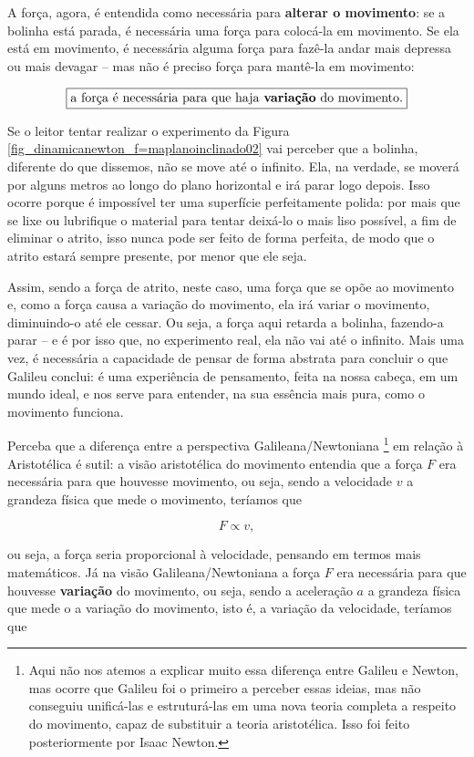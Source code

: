 A força, agora, é entendida como necessária para \textbf{alterar o movimento}:  se a bolinha está parada, é necessária uma força para colocá-la em movimento. Se ela está em movimento, é necessária alguma força para fazê-la andar mais depressa ou mais devagar -- mas não é preciso força para mantê-la em movimento:

$$ \boxed{\text{a força é necessária para que haja \textbf{variação} do movimento.} }$$

Se o leitor tentar realizar o experimento da Figura \ref{fig_dinamicanewton_f=maplanoinclinado02} vai perceber que a bolinha, diferente do que dissemos, não se move até o infinito. Ela, na verdade, se moverá por alguns metros ao longo do plano horizontal e irá parar logo depois. Isso ocorre porque é impossível ter uma superfície perfeitamente polida: por mais que se lixe ou lubrifique o material para tentar deixá-lo o mais liso possível, a fim de eliminar o atrito, isso nunca pode ser feito de forma perfeita, de modo que o atrito estará sempre presente, por menor que ele seja. 

Assim, sendo a força de atrito, neste caso, uma força que se opõe ao movimento e, como a força causa a variação do movimento, ela irá variar o movimento, diminuindo-o até ele cessar. Ou seja, a força aqui retarda a bolinha, fazendo-a parar -- e é por isso que, no experimento real, ela não vai até o infinito. Mais uma vez, é necessária a capacidade de pensar de forma abstrata para concluir o que Galileu conclui: é uma experiência de pensamento, feita na nossa cabeça, em um mundo ideal, e nos serve para entender, na sua essência mais pura, como o movimento funciona.

Perceba que a diferença entre a perspectiva Galileana/Newtoniana \footnote{Aqui não nos atemos a explicar muito essa diferença entre Galileu e Newton, mas ocorre que Galileu foi o primeiro a perceber essas ideias, mas não conseguiu unificá-las e estruturá-las em uma nova teoria completa a respeito do movimento, capaz de substituir a teoria aristotélica. Isso foi feito posteriormente por Isaac Newton.} em relação à Aristotélica é sutil: a visão aristotélica do movimento entendia que a força $F$ era necessária para que houvesse movimento, ou seja, sendo a velocidade $v$ a grandeza física que mede o movimento, teríamos que

$$ F \propto v,$$

\noindent ou seja, a força seria proporcional à velocidade, pensando em termos mais matemáticos. Já na visão Galileana/Newtoniana a força $F$ era necessária para que houvesse \textbf{variação} do movimento, ou seja, sendo a aceleração $a$ a grandeza física que mede o a variação do movimento, isto é, a variação da velocidade, teríamos que

